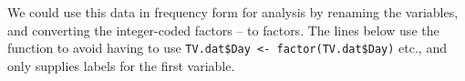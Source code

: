 \documentclass[11pt]{book}
\renewenvironment{knitrout}{\small\renewcommand{\baselinestretch}{.85}}{} %
\begin{document}
We could use this data in frequency form for analysis by renaming the variables,
and converting the integer-coded factors  --  to \R factors.
The lines below use the function  to avoid having to use
\verb|TV.dat$Day <- factor(TV.dat$Day)| etc., and only supplies labels for the
first variable.
\begin{knitrout}\footnotesize
{}\color{fgcolor}\begin{kframe}
\begin{alltt}
 \hlkwb{<-} 
 \hlkwb{<-} \hlstd{(}\hlstd{,} \hlstd{,} \hlstd{,} \hlstd{,} \hlstd{)}
 \hlkwb{<-}  \hlkwb{<-} 
                                      \hlstd{=}\hlstd{(}\hlstd{,} \hlstd{,} \hlstd{,} \hlstd{,} \hlstd{))}
                         \hlkwb{<-} 
                         \hlkwb{<-} 
                         \hlkwb{<-} 
\end{alltt}
\end{kframe}
\end{knitrout}
\end{document}

